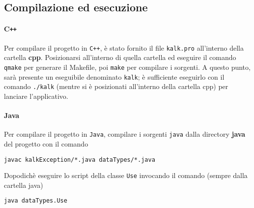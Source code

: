\subsection{Compilazione ed esecuzione}
\paragraph{C\texttt{++}} Per compilare il progetto in \texttt{C++}, è stato fornito il file \texttt{kalk.pro}
all'interno della cartella \textbf{cpp}. Posizionarsi all'interno di quella cartella ed eseguire il comando
\texttt{qmake} per generare il Makefile, poi \texttt{make} per compilare i sorgenti. A questo punto, sar\`a presente
un eseguibile denominato \texttt{kalk}; è sufficiente eseguirlo con il comando \texttt{./kalk} (mentre si è posizionati
all'interno della cartella cpp) per lanciare l'applicativo.

\paragraph{Java} Per compilare il progetto in \texttt{Java}, compilare i sorgenti \texttt{java} dalla directory \textbf{java}
del progetto con il comando 
\begin{center}
    \texttt{javac kalkException/*.java dataTypes/*.java} \par
\end{center} 
Dopodichè eseguire lo script della classe \texttt{Use} invocando il comando (sempre dalla cartella java)
\begin{center}
    \texttt{java dataTypes.Use}
\end{center}
